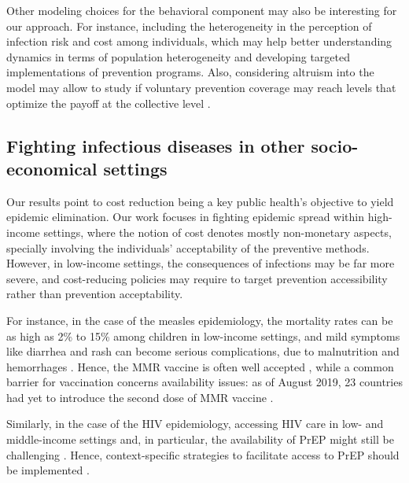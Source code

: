 Other modeling choices for the behavioral component may also be interesting for our approach. For instance, including the heterogeneity in the perception of infection risk and cost among individuals, which may help better understanding dynamics in terms of population heterogeneity and developing targeted implementations of prevention programs. Also, considering altruism into the model may allow to study if voluntary prevention coverage may reach levels that optimize the payoff at the collective level \cite[]{Shim2012}. 



\subsection{Fighting infectious diseases in other socio-economical settings}
Our results point to cost reduction being a key public health's objective to yield epidemic elimination. Our work focuses in fighting epidemic spread within high-income settings, where the notion of cost denotes mostly non-monetary aspects, specially involving the individuals' acceptability of the preventive methods. However, in low-income settings, the consequences of infections may be far more severe, and cost-reducing policies may require to target prevention accessibility rather than prevention acceptability. 

For instance, in the case of the measles epidemiology, the mortality rates can be as high as 2\% to 15\% among children in low-income settings, and mild symptoms like diarrhea and rash can become serious complications, due to malnutrition and hemorrhages \cite[]{Sever2011}. Hence, the MMR vaccine is often well accepted \cite[]{Larson2016}, while a common barrier for vaccination concerns availability issues: as of August 2019, 23 countries had yet to introduce the second dose of MMR vaccine \cite[]{WHO_MeaslesWW2019}. 

Similarly, in the case of the HIV epidemiology, accessing HIV care in low- and middle-income settings and, in particular, the availability of PrEP might still be challenging \cite[]{UNAIDS_Data2019}. Hence, context-specific strategies to facilitate access to PrEP should be implemented \cite[]{Rebe2019}. 


